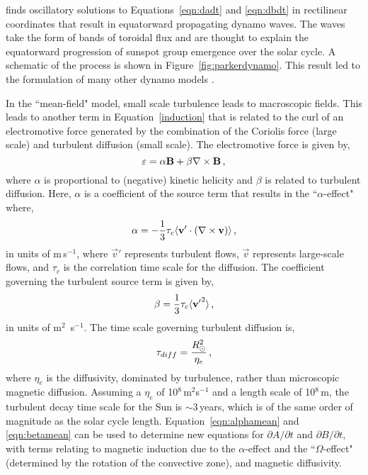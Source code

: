\cite{Parker:1955} finds oscillatory solutions to Equations~\ref{eqn:dadt} and \ref{eqn:dbdt} in rectilinear coordinates that result in equatorward propagating dynamo waves. The waves take the form of bands of toroidal flux and are thought to explain the equatorward progression of sunspot group emergence over the solar cycle. A schematic of the process is shown in Figure~\ref{fig:parkerdynamo}. This result led to the formulation of many other dynamo models  \citep{Charbonneau:2010}.

In the ``mean-field" model, small scale turbulence leads to macroscopic fields. This leads to another term in Equation~\ref{induction} that is related to the curl of an electromotive force generated by the combination of the Coriolis force (large scale) and turbulent diffusion (small scale). The electromotive force is given by, 
\begin{equation}\label{eqn:epsmean}
\varepsilon = \alpha \vec{B} + \beta \nabla \times \vec{B} \mbox{\,,}
\end{equation}
where $\alpha$ is proportional to (negative) kinetic helicity and $\beta$ is related to turbulent diffusion. 
Here, $\alpha$ is a coefficient of the source term that results in the ``$\alpha$-effect" where,
\begin{equation}\label{eqn:alphamean}
\alpha = -\frac{1}{3} \tau_c \langle \vec{v}' \cdot (\nabla \times \vec{v}) \rangle \mbox{\,,}
\end{equation}
in units of m\,s$^{-1}$, where $\vec{v}'$ represents turbulent flows, $\vec{v}$ represents large-scale flows, and $\tau_c$ is the correlation time scale for the diffusion. The coefficient governing the turbulent source term is given by, 
\begin{equation}\label{eqn:betamean}
\beta = \frac{1}{3} \tau_c \langle {\vec{v}'}^2 \rangle \mbox{\,,}
\end{equation}
in units of m$^2$~s$^{-1}$. The time scale governing turbulent diffusion is,
\begin{equation}\label{eqn:taumean}
\tau_{diff} = \frac{R_{\odot}^2}{\eta_e} \mbox{\,,}
\end{equation}
where $\eta_e$ is the diffusivity, dominated by turbulence, rather than microscopic magnetic diffusion. Assuming a $\eta_e$ of 10$^8$\,m$^2$s$^{-1}$ and a length scale of 10$^8$\,m, the turbulent decay time scale for the Sun is $\sim$3\,years, which is of the same order of magnitude as the solar cycle length.
Equation~\ref{eqn:alphamean} and \ref{eqn:betamean} can be used to determine new equations for $\partial A/\partial t$ and $\partial B/\partial t$, with terms relating to magnetic induction due to the $\alpha$-effect and the ``$\Omega$-effect" (determined by the rotation of the convective zone), and magnetic diffusivity. 

